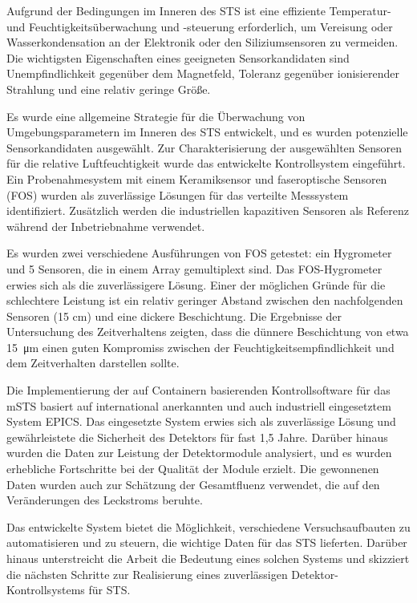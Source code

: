 Aufgrund der Bedingungen im Inneren des \gls{STS} ist eine effiziente Temperatur- und Feuchtigkeitsüberwachung und -steuerung erforderlich, um Vereisung oder Wasserkondensation an der Elektronik oder den Siliziumsensoren zu vermeiden. Die wichtigsten Eigenschaften eines geeigneten Sensorkandidaten sind Unempfindlichkeit gegenüber dem Magnetfeld, Toleranz gegenüber ionisierender Strahlung und eine relativ geringe Größe.

Es wurde eine allgemeine Strategie für die Überwachung von Umgebungsparametern im Inneren des \gls{STS} entwickelt, und es wurden potenzielle Sensorkandidaten ausgewählt. Zur Charakterisierung der ausgewählten Sensoren für die relative Luftfeuchtigkeit wurde das entwickelte Kontrollsystem eingeführt. Ein Probenahmesystem mit einem Keramiksensor und faseroptische Sensoren (\gls{FOS}) wurden als zuverlässige Lösungen für das verteilte Messsystem identifiziert. Zusätzlich werden die industriellen kapazitiven Sensoren als Referenz während der Inbetriebnahme verwendet.

Es wurden zwei verschiedene Ausführungen von \gls{FOS} getestet: ein Hygrometer und 5 Sensoren, die in einem Array gemultiplext sind. Das \gls{FOS}-Hygrometer erwies sich als die zuverlässigere Lösung. Einer der möglichen Gründe für die schlechtere Leistung ist ein relativ geringer Abstand zwischen den nachfolgenden Sensoren (15 cm) und eine dickere Beschichtung. Die Ergebnisse der Untersuchung des Zeitverhaltens zeigten, dass die dünnere Beschichtung von etwa \SI{15}{\micro\metre} einen guten Kompromiss zwischen der Feuchtigkeitsempfindlichkeit und dem Zeitverhalten darstellen sollte. 

Die Implementierung der auf Containern basierenden Kontrollsoftware für das \gls{mSTS} basiert auf international anerkannten und auch industriell eingesetztem System EPICS. Das eingesetzte System erwies sich als zuverlässige Lösung und gewährleistete die Sicherheit des Detektors für fast 1,5 Jahre. Darüber hinaus wurden die Daten zur Leistung der Detektormodule analysiert, und es wurden erhebliche Fortschritte bei der Qualität der Module erzielt. Die gewonnenen Daten wurden auch zur Schätzung der Gesamtfluenz verwendet, die auf den Veränderungen des Leckstroms beruhte. 

Das entwickelte System bietet die Möglichkeit, verschiedene Versuchsaufbauten zu automatisieren und zu steuern, die wichtige Daten für das \gls{STS} lieferten. Darüber hinaus unterstreicht die Arbeit die Bedeutung eines solchen Systems und skizziert die nächsten Schritte zur Realisierung eines zuverlässigen Detektor-Kontrollsystems für \gls{STS}.